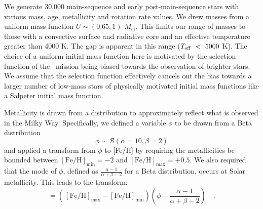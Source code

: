

We generate 30,000 main-sequence and early post-main-sequence stars with various mass, age, metallicity and rotation rate values.
We drew masses from a uniform mass function $U\sim\left(0.65,1\right)$ $M_{\odot}$.
This limits our range of masses to those with a convective surface and radiative core and an effective temperature greater than 4000 K.
The gap is apparent in this range ($T_{\rm{eff}} \ < \ 5000$ K).
The choice of a uniform initial mass function here is motivated by the selection function of the \kepler\ mission being biased towards the observation of brighter stars.
We assume that the selection function effectively cancels out the bias towards a larger number of low-mass stars of physically motivated initial mass functions like a Salpeter initial mass function.

Metallicity is drawn from a distribution to approximately reflect what is observed in the Milky Way. Specifically, we defined a variable $\phi$ to be drawn from a Beta distribution
\begin{equation}
 \phi \sim \mathcal{B}\left(\alpha=10, \beta=2\right)
\end{equation}
and applied a transform from $\phi$ to [Fe/H] by requiring the metallicities be bounded between $[\mathrm{Fe/H}]_\mathrm{min} =-2$ and $[\mathrm{Fe/H}]_\mathrm{max} = +0.5$. We also required that the mode of $\phi$, defined as $\frac{\alpha - 1}{\alpha + \beta - 2}$ for a Beta distribution, occurs at Solar metallicity. This leads to the transform:
\begin{equation}
 [\mathrm{Fe/H}] = \left(\frac{}{}[\mathrm{Fe/H}]_\mathrm{max}-[\mathrm{Fe/H}]_\mathrm{min}\right)\left(\phi - \frac{\alpha - 1}{\alpha + \beta - 2}\right) \quad .
\end{equation}

